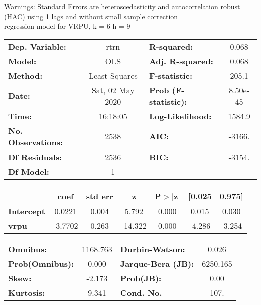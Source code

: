 Warnings: \newline
 [1] Standard Errors are heteroscedasticity and autocorrelation robust (HAC) using 1 lags and without small sample correction\\ 

regression model for VRPU, k = 6 h = 9\begin{center}
\begin{tabular}{lclc}
\toprule
\textbf{Dep. Variable:}    &       rtrn       & \textbf{  R-squared:         } &     0.068   \\
\textbf{Model:}            &       OLS        & \textbf{  Adj. R-squared:    } &     0.068   \\
\textbf{Method:}           &  Least Squares   & \textbf{  F-statistic:       } &     205.1   \\
\textbf{Date:}             & Sat, 02 May 2020 & \textbf{  Prob (F-statistic):} &  8.50e-45   \\
\textbf{Time:}             &     16:18:05     & \textbf{  Log-Likelihood:    } &    1584.9   \\
\textbf{No. Observations:} &        2538      & \textbf{  AIC:               } &    -3166.   \\
\textbf{Df Residuals:}     &        2536      & \textbf{  BIC:               } &    -3154.   \\
\textbf{Df Model:}         &           1      & \textbf{                     } &             \\
\bottomrule
\end{tabular}
\begin{tabular}{lcccccc}
                   & \textbf{coef} & \textbf{std err} & \textbf{z} & \textbf{P$> |$z$|$} & \textbf{[0.025} & \textbf{0.975]}  \\
\midrule
\textbf{Intercept} &       0.0221  &        0.004     &     5.792  &         0.000        &        0.015    &        0.030     \\
\textbf{vrpu}      &      -3.7702  &        0.263     &   -14.322  &         0.000        &       -4.286    &       -3.254     \\
\bottomrule
\end{tabular}
\begin{tabular}{lclc}
\textbf{Omnibus:}       & 1168.763 & \textbf{  Durbin-Watson:     } &    0.026  \\
\textbf{Prob(Omnibus):} &   0.000  & \textbf{  Jarque-Bera (JB):  } & 6250.165  \\
\textbf{Skew:}          &  -2.173  & \textbf{  Prob(JB):          } &     0.00  \\
\textbf{Kurtosis:}      &   9.341  & \textbf{  Cond. No.          } &     107.  \\
\bottomrule
\end{tabular}
\end{center}

